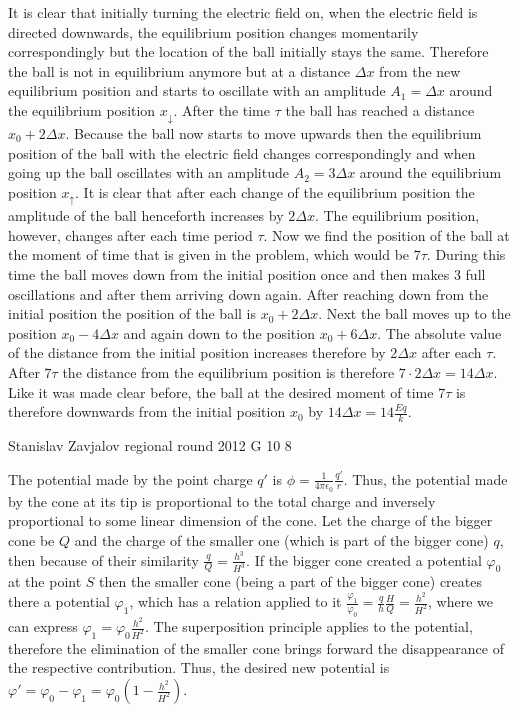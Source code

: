 \documentclass[11pt]{article}
\begin{document}
{It is clear that initially turning the electric field on, when the electric field is directed downwards, the equilibrium position changes momentarily correspondingly but the location of the ball initially stays the same. Therefore the ball is not in equilibrium anymore but at a distance $\Delta x$ from the new equilibrium position and starts to oscillate with an amplitude $A_1 = \Delta x$ around the equilibrium position $x_\downarrow$. After the time $\tau$ the ball has reached a distance $x_0 + 2\Delta x$. Because the ball now starts to move upwards then the equilibrium position of the ball with the electric field changes correspondingly and when going up the ball oscillates with an amplitude $A_2 = 3 \Delta x$ around the equilibrium position $x_\uparrow$. It is clear that after each change of the equilibrium position the amplitude of the ball henceforth increases by $2 \Delta x$. The equilibrium position, however, changes after each time period $\tau$. Now we find the position of the ball at the moment of time that is given in the problem, which would be $7 \tau$. During this time the ball moves down from the initial position once and then makes $3$ full oscillations and after them arriving down again. After reaching down from the initial position the position of the ball is $x_0 + 2 \Delta x $. Next the ball moves up to the position $x_0 - 4 \Delta x$ and again down to the position $x_0 + 6 \Delta x$. The absolute value of the distance from the initial position increases therefore by $2 \Delta x$ after each $\tau$. After $7 \tau$ the distance from the equilibrium position is therefore $7 \cdot 2 \Delta x = 14 \Delta x$. Like it was made clear before, the ball at the desired moment of time $7 \tau$ is therefore downwards from the initial position $x_0$ by $14 \Delta x = 14 \frac{Eq}{k}$.
\fi
}

{Stanislav Zavjalov} %
{regional round} %
{2012} %
{G 10} %
{8} %
{

\ifEngSolution
The potential made by the point charge $q'$ is $\phi = \frac{1}{4 \pi \epsilon_0} \frac{q'}{r}$. Thus, the potential made by the cone at its tip is proportional to the total charge and inversely proportional to some linear dimension of the cone. Let the charge of the bigger cone be $Q$ and the charge of the smaller one (which is part of the bigger cone) $q$, then because of their similarity $\frac{q}{Q} = \frac{h^3}{H^3}$. If the bigger cone created a potential $\varphi_0$ at the point $S$ then the smaller cone (being a part of the bigger cone) creates there a potential $\varphi_1$, which has a relation applied to it $\frac{\varphi_1}{\varphi_0} = \frac{q}{h} \frac{H}{Q} = \frac{h^2}{H^2}$, where we can express $\varphi_1 = \varphi_0 \frac{h^2}{H^2}$. The superposition principle applies to the potential, therefore the elimination of the smaller cone brings forward the disappearance of the respective contribution. Thus, the desired new potential is $\varphi' = \varphi_0 - \varphi_1 = \varphi_0 ( 1 - \frac{h^2}{H^2})$.
\fi
}
\end{document}
